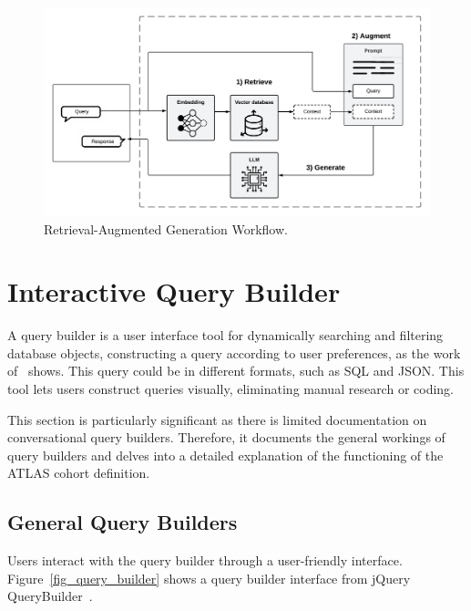 \begin{figure}[ht]
    \includegraphics[width=14cm]{figs/chapter2/rag_workflow.png}
    \centering
    \caption[Retrieval-Augmented Generation Workflow]{Retrieval-Augmented Generation Workflow.}
    \label{fig_rag}
\end{figure}




\section{Interactive Query Builder}

A query builder is a user interface tool for dynamically searching and filtering database objects, constructing a query according to user preferences, as the work of~\citet{mussa_forestqb_2022} shows. This query could be in different formats, such as SQL and JSON. This tool lets users construct queries visually, eliminating manual research or coding. 

This section is particularly significant as there is limited documentation on conversational query builders. Therefore, it documents the general workings of query builders and delves into a detailed explanation of the functioning of the ATLAS cohort definition.

\subsection{General Query Builders}


Users interact with the query builder through a user-friendly interface. Figure~\ref{fig_query_builder} shows a query builder interface from jQuery QueryBuilder~\cite{noauthor_jquery_nodate}.


